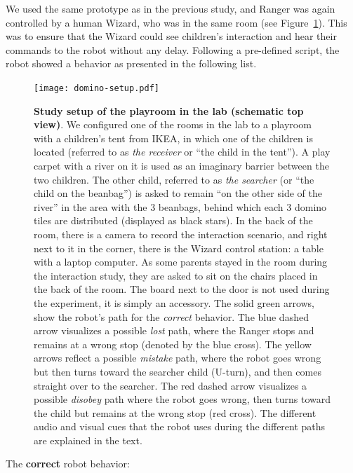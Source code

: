 \documentclass{sig-alternate}
\begin{document}
We used the same prototype as in the previous study, and Ranger was again
controlled by a human Wizard, who was in the same room (see
Figure~\ref{fig:domino-setup}). This was to ensure that the Wizard could see
children's interaction and hear their commands to the robot without any delay.
Following a pre-defined script, the robot showed a behavior as presented in the
following list.

\begin{figure}[!b] 
    \centering 
    \texttt{[image: domino-setup.pdf]} 
    \caption[Study Setup of the Playroom in the Lab]{\small \textbf{Study setup
    of the playroom in the lab (schematic top view)}. We configured one of the
    rooms in the lab to a playroom with a children's tent from IKEA, in which one of
    the children is located (referred to as \textit{the receiver} or ``the child in
    the tent''). A play carpet with a river on it is used as an imaginary barrier
    between the two children. The other child, referred to as \textit{the searcher}
    (or ``the child on the beanbag'') is asked to remain ``on the other side of the
    river'' in the area with the 3 beanbags, behind which each 3 domino tiles are
    distributed (displayed as black stars). In the back of the room, there is a
    camera to record the interaction scenario, and right next to it in the corner,
    there is the Wizard control station: a table with a laptop computer. As some
    parents stayed in the room during the interaction study, they are asked to sit
    on the chairs placed in the back of the room. The board next to the door is not
    used during the experiment, it is simply an accessory. The solid green arrows,
    show the robot's path for the \textit{correct} behavior. The blue dashed arrow
    visualizes a possible \textit{lost} path, where the Ranger stops and remains at
    a wrong stop (denoted by the blue cross). The yellow arrows reflect a possible
    \textit{mistake} path, where the robot goes wrong but then turns toward the
    searcher child (U-turn), and then comes straight over to the searcher. The red
    dashed arrow visualizes a possible \textit{disobey} path where the robot goes
    wrong, then turns toward the child but remains at the wrong stop (red cross).
    The different audio and visual cues that the robot uses during the different
    paths are explained in the text.} 

    \label{fig:domino-setup} 
\end{figure}

The \textbf{correct} robot behavior:
\end{document}
